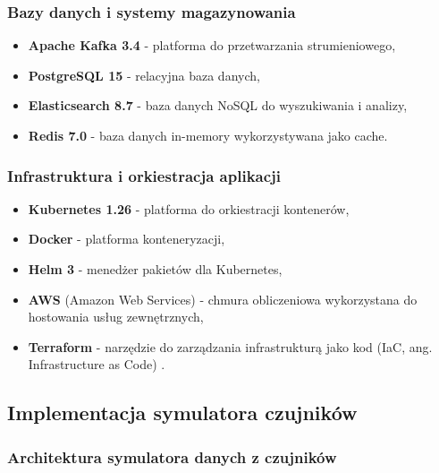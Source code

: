 \subsubsection{Bazy danych i systemy magazynowania}
\label{subsubsec:bazy_danych}

\begin{itemize}
    \item \textbf{Apache Kafka 3.4} \cite{kafka} - platforma do przetwarzania strumieniowego,
    \item \textbf{PostgreSQL 15} - relacyjna baza danych,
    \item \textbf{Elasticsearch 8.7} - baza danych NoSQL \cite{nosql_definition} do wyszukiwania i analizy,
    \item \textbf{Redis 7.0} - baza danych in-memory wykorzystywana jako cache.
\end{itemize}

\subsubsection{Infrastruktura i orkiestracja aplikacji}
\label{subsubsec:infrastruktura}

\begin{itemize}
    \item \textbf{Kubernetes 1.26} \cite{kubernetes} - platforma do orkiestracji kontenerów,
    \item \textbf{Docker} - platforma konteneryzacji,
    \item \textbf{Helm 3} - menedżer pakietów dla Kubernetes,
    \item \textbf{AWS} (Amazon Web Services) \cite{aws_definition} - chmura obliczeniowa wykorzystana do hostowania usług zewnętrznych,
    \item \textbf{Terraform} - narzędzie do zarządzania infrastrukturą jako kod (IaC, ang. Infrastructure as Code) \cite{terraform_docs}.
\end{itemize}

\subsection{Implementacja symulatora czujników}
\label{subsec:implementacja_symulatora}

\subsubsection{Architektura symulatora danych z czujników}
\label{subsubsec:architektura_symulatora}

